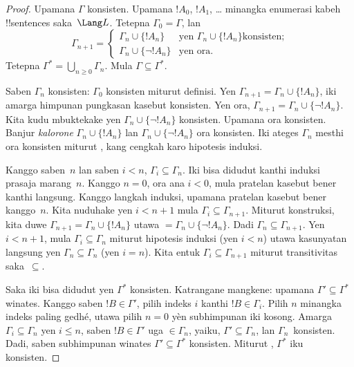 \documentclass[../../../include/open-logic-section]{subfiles}
\begin{document}
\begin{proof}
Upamana $\Gamma$ konsisten. Upamana $!A_0$, $!A_1$, \dots{} minangka
enumerasi kabeh !!{sentence}s saka~$\Lang L$. Tetepna $\Gamma_0 =
\Gamma$, lan
\[
\Gamma_{n+1} =
\begin{cases}
\Gamma_n \cup \{ !A_n \} & \textrm{yen $\Gamma_n \cup \{!A_n\}$
  konsisten;} \\
\Gamma_n \cup \{ \lnot !A_n \} & \textrm{yen ora.}
\end{cases}
\]
Tetepna $\Gamma^* = \bigcup_{n \geq 0} \Gamma_n$.
Mula $\Gamma \subseteq \Gamma^*$.

Saben $\Gamma_n$ konsisten: $\Gamma_0$ konsisten miturut definisi.
Yen $\Gamma_{n+1} = \Gamma_n \cup \{!A_n\}$, iki amarga himpunan
pungkasan kasebut konsisten. Yen ora, $\Gamma_{n+1} = \Gamma_n \cup
\{\lnot !A_n\}$. Kita kudu mbuktekake yen $\Gamma_n \cup \{\lnot
!A_n\}$ konsisten. Upamana ora konsisten. Banjur \emph{kalorone}
$\Gamma_n \cup \{!A_n\}$ lan $\Gamma_n \cup \{\lnot !A_n\}$ ora
konsisten. Iki ateges $\Gamma_n$ mesthi ora konsisten miturut
,
kang cengkah karo hipotesis induksi.

Kanggo saben~$n$ lan saben $i < n$, $\Gamma_i \subseteq \Gamma_n$.
Iki bisa didudut kanthi induksi prasaja marang~$n$. Kanggo $n=0$,
ora ana $i < 0$, mula pratelan kasebut bener kanthi langsung. Kanggo
langkah induksi, upamana pratelan kasebut bener kanggo~$n$. Kita
nuduhake yen $i < n+1$ mula $\Gamma_i \subseteq \Gamma_{n+1}$. Miturut
konstruksi, kita duwe $\Gamma_{n+1} = \Gamma_n \cup \{!A_n\}$ utawa
$= \Gamma_n \cup \{\lnot !A_n\}$. Dadi $\Gamma_n \subseteq
\Gamma_{n+1}$. Yen $i < n+1$, mula $\Gamma_i \subseteq \Gamma_n$
miturut hipotesis induksi (yen $i < n$) utawa kasunyatan langsung yen
$\Gamma_n \subseteq \Gamma_n$ (yen $i = n$). Kita entuk $\Gamma_i
\subseteq \Gamma_{n+1}$ miturut transitivitas saka~$\subseteq$.

Saka iki bisa didudut yen $\Gamma^*$ konsisten. Katrangane mangkene:
upamana $\Gamma' \subseteq \Gamma^*$ winates. Kanggo saben
$!B \in \Gamma'$, pilih indeks $i$ kanthi $!B\in\Gamma_i$. Pilih
$n$ minangka indeks paling gedhé, utawa pilih $n=0$ yèn subhimpunan iki kosong.
Amarga $\Gamma_i \subseteq \Gamma_n$ yen $i
\le n$, saben $!B \in \Gamma'$ uga $\in \Gamma_n$, yaiku, $\Gamma'
\subseteq \Gamma_n$, lan $\Gamma_n$~konsisten. Dadi, saben subhimpunan
winates $\Gamma' \subseteq \Gamma^*$ konsisten. Miturut
, $\Gamma^*$ iku
  konsisten.


\end{proof}
\end{document}
